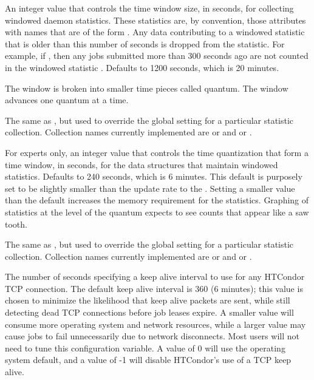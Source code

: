\begin{description}
\label{param:StatisticsWindowSeconds}
\item[\Macro{STATISTICS\_WINDOW\_SECONDS}]
  An integer value that controls the time window size, in seconds, for
  collecting windowed daemon statistics.
  These statistics are, by convention, those attributes with names that 
  are of the form .  Any data contributing to a
  windowed statistic that is older than this number of seconds is dropped
  from the statistic.  
  For example, if ,
  then any jobs submitted more than 300 seconds ago are not counted 
  in the windowed statistic .  
  Defaults to 1200 seconds, which is 20 minutes.

  The window is broken into smaller time pieces called quantum.
  The window advances one quantum at a time.

\label{param:StatisticsWindowSecondsCollection}
\item[\Macro{STATISTICS\_WINDOW\_SECONDS\_<collection>}]
  The same as , 
  but used to 
  override the global setting for a particular statistic collection.  
  Collection names currently implemented are  or 
  and  or .

\label{param:StatisticsWindowQuantum}
\item[\Macro{STATISTICS\_WINDOW\_QUANTUM}]
  For experts only,
  an integer value that controls the time quantization that form a
  time window, 
  in seconds, for the data structures that maintain windowed statistics.
  Defaults to 240 seconds, which is 6 minutes.
  This default is purposely set to be slightly smaller than the update
  rate to the . 
  Setting a smaller value than the default increases the memory requirement
  for the statistics.
  Graphing of statistics at the level of the quantum
  expects to see counts that appear like a saw tooth. 

\label{param:StatisticsWindowQuantumCollection}
\item[\Macro{STATISTICS\_WINDOW\_QUANTUM\_<collection>}]
  The same as , 
  but used to 
  override the global setting for a particular statistic collection.  
  Collection names currently implemented are  or 
  and  or .

\label{param:TcpKeepaliveInterval}
\item[\Macro{TCP\_KEEPALIVE\_INTERVAL}]
  The number of seconds specifying a keep alive interval
  to use for any HTCondor TCP connection.
  The default keep alive interval is 360 (6 minutes); 
  this value is chosen to minimize the likelihood that keep alive packets 
  are sent,
  while still detecting dead TCP connections before job leases expire.
  A smaller value
  will consume more operating system and network resources, 
  while a larger value may cause jobs to fail unnecessarily due to 
  network disconnects.  
  Most users will not need to tune this configuration variable.
  A value of 0 will use the operating system default,
  and a value of -1 will disable HTCondor's use of a TCP keep alive.


\end{description}
